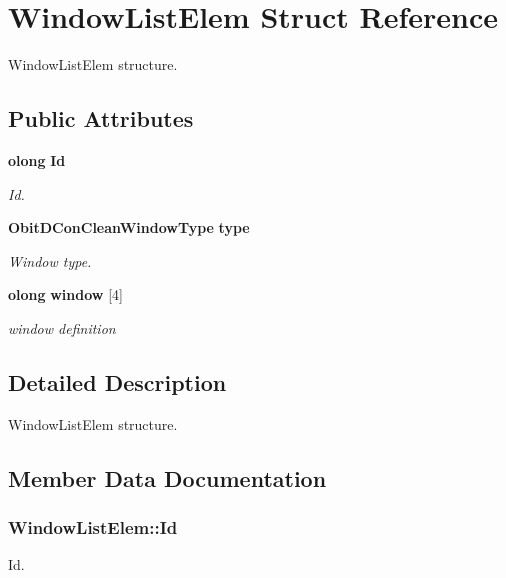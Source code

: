 \section{Window\-List\-Elem Struct Reference}
\label{structWindowListElem}
Window\-List\-Elem structure.  


\subsection*{Public Attributes}
\begin{CompactItemize}
\item 
{\bf olong} {\bf Id}
\begin{CompactList}\small\item\em Id. \item\end{CompactList}\item 
{\bf Obit\-DCon\-Clean\-Window\-Type} {\bf type}
\begin{CompactList}\small\item\em Window type. \item\end{CompactList}\item 
{\bf olong} {\bf window} [4]
\begin{CompactList}\small\item\em window definition \item\end{CompactList}\end{CompactItemize}


\subsection{Detailed Description}
Window\-List\-Elem structure. 



\subsection{Member Data Documentation}
\subsubsection{ {\bf Window\-List\-Elem::Id}}\label{structWindowListElem_o0}


Id. 


